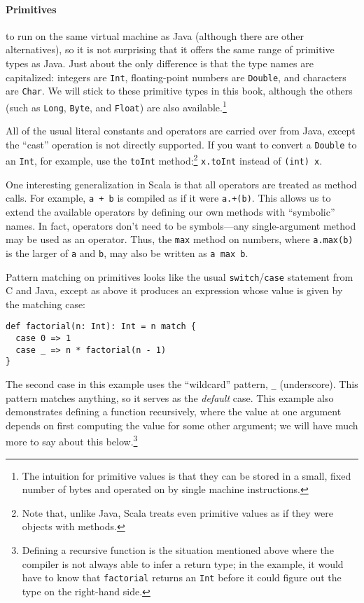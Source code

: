 \paragraph{Primitives}
 to run on the same virtual machine as Java (although there are other alternatives), so it is not surprising that it offers the same range of primitive types as Java. Just about the only difference is that the type names are capitalized: integers are \verb|Int|, floating-point numbers are \verb|Double|, and characters are \verb|Char|. We will stick to these primitive types in this book, although the others (such as \verb|Long|, \verb|Byte|, and \verb|Float|) are also available.\footnote{The intuition for primitive values is that they can be stored in a small, fixed number of bytes and operated on by single machine instructions.}

All of the usual literal constants and operators are carried over from Java, except the ``cast'' operation is not directly supported. If you want to convert a \verb|Double| to an \verb|Int|, for example, use the \verb|toInt| method:\footnote{Note that, unlike Java, Scala treats even primitive values as if they were objects with methods.} \verb|x.toInt| instead of \verb|(int) x|.

One interesting generalization in Scala is that all operators are treated as method calls. For example, \verb|a + b| is compiled as if it were \verb|a.+(b)|. This allows us to extend the available operators by defining our own methods with ``symbolic'' names. In fact, operators don't need to be symbols---any single-argument method may be used as an operator. Thus, the \verb|max| method on numbers, where \verb|a.max(b)| is the larger of \verb|a| and \verb|b|, may also be written as \verb|a max b|.

Pattern matching on primitives looks like the usual \verb|switch|/\verb|case| statement from C and Java, except as above it produces an expression whose value is given by the matching case:
\begin{verbatim}
def factorial(n: Int): Int = n match {
  case 0 => 1
  case _ => n * factorial(n - 1)
}
\end{verbatim}
The second case in this example uses the ``wildcard'' pattern, \verb|_| (underscore). This pattern matches anything, so it serves as the \emph{default} case. This example also demonstrates defining a function recursively, where the value at one argument depends on first computing the value for some other argument; we will have much more to say about this below.\footnote{Defining a recursive function is the situation mentioned above where the compiler is not always able to infer a return type; in the example, it would have to know that \texttt{factorial} returns an \texttt{Int} before it could figure out the type on the right-hand side.}

